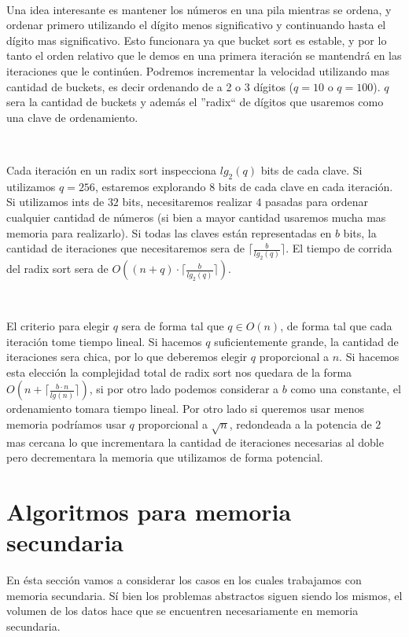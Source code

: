 ~

Una idea interesante es mantener los n\'umeros en una pila mientras se ordena, y ordenar primero utilizando el d\'igito menos significativo y continuando hasta el d\'igito mas significativo. Esto funcionara ya que bucket sort es estable, y por lo tanto el orden relativo que le demos en una primera iteraci\'on se mantendr\'a en las iteraciones que le contin\'uen. Podremos incrementar la velocidad utilizando mas cantidad de buckets, es decir ordenando de a 2 o 3 d\'igitos ($q=10$ o $q=100$). $q$ sera la cantidad de buckets y adem\'as el ''radix`` de d\'igitos que usaremos como una clave de ordenamiento.

~

Cada iteraci\'on en un radix sort inspecciona $lg_2(q)$ bits de cada clave. Si utilizamos $q=256$, estaremos explorando $8$ bits de cada clave en cada iteraci\'on. Si utilizamos ints de $32$ bits, necesitaremos realizar $4$ pasadas para ordenar cualquier cantidad de n\'umeros (si bien a mayor cantidad usaremos mucha mas memoria para realizarlo). Si todas las claves est\'an representadas en $b$ bits, la cantidad de iteraciones que necesitaremos sera de $\lceil \frac{b}{lg_2(q)} \rceil$. El tiempo de corrida del radix sort sera de $O((n+q) \cdot \lceil \frac{b}{lg_2(q)} \rceil)$.

~

El criterio para elegir $q$ sera de forma tal que $q \in O(n)$, de forma tal que cada iteraci\'on tome tiempo lineal. Si hacemos $q$ suficientemente grande, la cantidad de iteraciones sera chica, por lo que deberemos elegir $q$ proporcional a $n$. Si hacemos esta elecci\'on la complejidad total de radix sort nos quedara de la forma $O(n + \lceil \frac{b \cdot n}{lg(n)} \rceil)$, si por otro lado podemos considerar a $b$ como una constante, el ordenamiento tomara tiempo lineal. Por otro lado si queremos usar menos memoria podr\'iamos usar $q$ proporcional a $\sqrt{n}$, redondeada a la potencia de $2$ mas cercana lo que incrementara la cantidad de iteraciones necesarias al doble pero decrementara la memoria que utilizamos de forma potencial.

\newpage
\section{Algoritmos para memoria secundaria}

En \'esta secci\'on vamos a considerar los casos en los cuales trabajamos con memoria secundaria. S\'i bien los problemas abstractos siguen siendo los mismos, el volumen de los datos hace que se encuentren necesariamente en memoria secundaria. 

